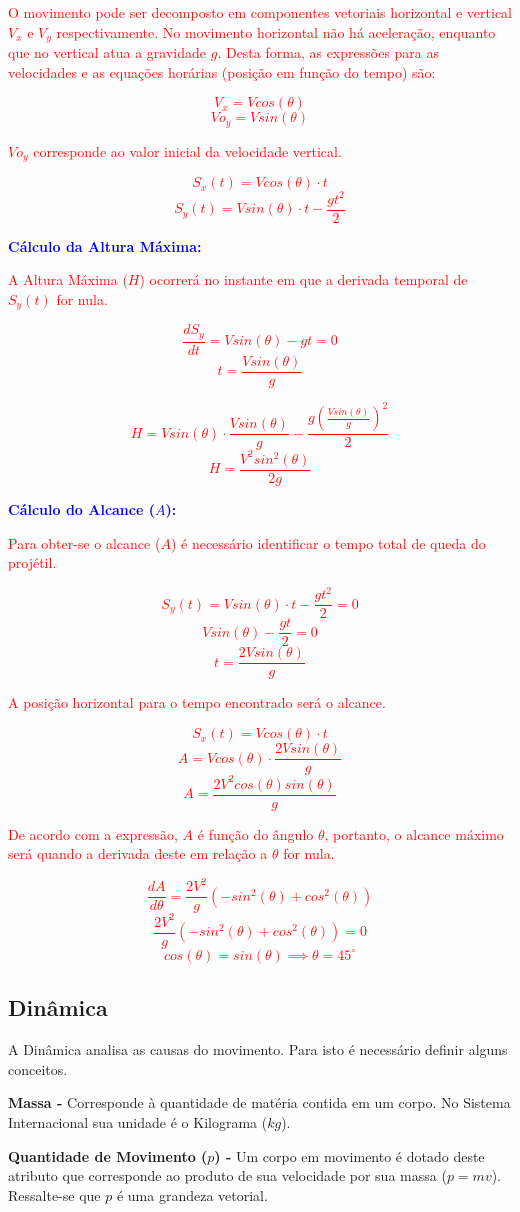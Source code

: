 \documentclass[
    12pt, %
    openright,
    twoside, %
    a4paper, %
    article,
    english,brazil %
]{abntex2}
\begin{document}
\textcolor{red}{O movimento pode ser decomposto em componentes vetoriais horizontal e vertical $V_x$ e $V_y$ respectivamente. No movimento horizontal não há aceleração, enquanto que no vertical atua a gravidade $g$. Desta forma, as expressões para as velocidades e as equações horárias (posição em função do tempo) são:}

\textcolor{red}{
    $$V_x = V cos(\theta)$$
    $$Vo_y = V sin(\theta)$$
}

\textcolor{red}{$Vo_y$ corresponde ao valor inicial da velocidade vertical.}

\textcolor{red}{
    $$S_x(t) = V cos(\theta) \cdot t$$
    $$S_y(t) = V sin(\theta) \cdot t - \frac{gt^2}{2}$$
}

\textcolor{blue}{\textbf{Cálculo da Altura Máxima:}}

\textcolor{red}{A Altura Máxima ($H$) ocorrerá no instante em que a derivada temporal de $S_y(t)$ for nula.}

\textcolor{red}{
    $$\frac{dS_y}{dt} = V sin(\theta) - gt = 0$$
    $$t = \frac{V sin(\theta)}{g}$$
}

\textcolor{red}{
    $$H = V sin(\theta) \cdot \frac{V sin(\theta)}{g} - \frac{g (\frac{V sin(\theta)}{g})^2}{2}$$
    $$H = \frac{V^2 sin^2(\theta)}{2g}$$
}

\textcolor{blue}{\textbf{Cálculo do Alcance ($A$):}}

\textcolor{red}{Para obter-se o alcance ($A$) é necessário identificar o tempo total de queda do projétil.}

\textcolor{red}{
    $$S_y(t) = V sin(\theta) \cdot t - \frac{gt^2}{2} = 0$$
    $$V sin(\theta) - \frac{gt}{2} = 0$$
    $$t = \frac{2V sin(\theta)}{g}$$
}

\textcolor{red}{A posição horizontal para o tempo encontrado será o alcance.}

\textcolor{red}{
    $$S_x(t) = V cos(\theta) \cdot t$$
    $$A = V cos(\theta) \cdot \frac{2V sin(\theta)}{g}$$
    $$A = \frac{2V^2 cos(\theta)sin(\theta)}{g}$$
}

\textcolor{red}{De acordo com a expressão, $A$ é função do ângulo $\theta$, portanto, o alcance máximo será quando a derivada deste em relação a $\theta$ for nula.}

\textcolor{red}{
    $$\frac{dA}{d\theta} = \frac{2V^2}{g}(-sin^2(\theta) + cos^2(\theta))$$
    $$\frac{2V^2}{g}(-sin^2(\theta) + cos^2(\theta)) = 0$$
    $$cos(\theta) = sin(\theta) \implies \theta = 45^\circ$$
}

\subsection{Dinâmica}

A Dinâmica analisa as causas do movimento. Para isto é necessário definir alguns conceitos.

\textbf{Massa - } Corresponde à quantidade de matéria contida em um corpo. No Sistema Internacional sua unidade é o Kilograma ($kg$).

\textbf{Quantidade de Movimento ($p$) - } Um corpo em movimento é dotado deste atributo que corresponde ao produto de sua velocidade por sua massa ($p = mv$). Ressalte-se que $p$ é uma grandeza vetorial.
\end{document}
